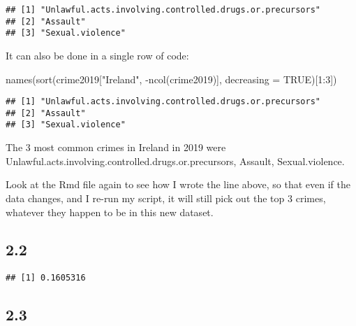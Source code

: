 \documentclass[
]{article}
\newenvironment{Shaded}{\begin{snugshade}}{\end{snugshade}}
\newcommand{\AttributeTok}[1]{\textcolor[rgb]{0.77,0.63,0.00}{#1}}
\newcommand{\ConstantTok}[1]{\textcolor[rgb]{0.00,0.00,0.00}{#1}}
\newcommand{\DecValTok}[1]{\textcolor[rgb]{0.00,0.00,0.81}{#1}}
\newcommand{\FunctionTok}[1]{\textcolor[rgb]{0.00,0.00,0.00}{#1}}
\newcommand{\NormalTok}[1]{#1}
\newcommand{\SpecialCharTok}[1]{\textcolor[rgb]{0.00,0.00,0.00}{#1}}
\newcommand{\StringTok}[1]{\textcolor[rgb]{0.31,0.60,0.02}{#1}}
\begin{document}
\begin{verbatim}
## [1] "Unlawful.acts.involving.controlled.drugs.or.precursors"
## [2] "Assault"                                               
## [3] "Sexual.violence"
\end{verbatim}

It can also be done in a single row of code:

\begin{Shaded}
\begin{Highlighting}[]
\FunctionTok{names}\NormalTok{(}\FunctionTok{sort}\NormalTok{(crime2019[}\StringTok{"Ireland"}\NormalTok{, }\SpecialCharTok{{-}}\FunctionTok{ncol}\NormalTok{(crime2019)], }\AttributeTok{decreasing =} \ConstantTok{TRUE}\NormalTok{)[}\DecValTok{1}\SpecialCharTok{:}\DecValTok{3}\NormalTok{])}
\end{Highlighting}
\end{Shaded}

\begin{verbatim}
## [1] "Unlawful.acts.involving.controlled.drugs.or.precursors"
## [2] "Assault"                                               
## [3] "Sexual.violence"
\end{verbatim}

The 3 most common crimes in Ireland in 2019 were
Unlawful.acts.involving.controlled.drugs.or.precursors, Assault,
Sexual.violence.

Look at the Rmd file again to see how I wrote the line above, so that
even if the data changes, and I re-run my script, it will still pick out
the top 3 crimes, whatever they happen to be in this new dataset.

\hypertarget{section-7}{%
\subsection{2.2}\label{section-7}}

\begin{Shaded}
\end{Shaded}

\begin{verbatim}
## [1] 0.1605316
\end{verbatim}

\hypertarget{section-8}{%
\subsection{2.3}\label{section-8}}
\end{document}
